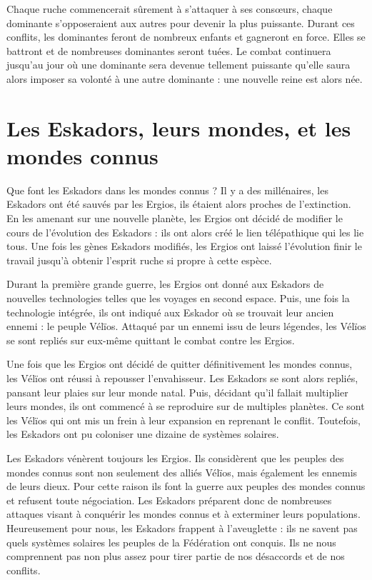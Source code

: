 \begin{multicols}{2}
Chaque ruche commencerait sûrement à s'attaquer à ses consœurs, chaque dominante s'opposeraient aux autres pour devenir la plus puissante. Durant ces conflits, les dominantes feront de nombreux enfants et gagneront en force. Elles se battront et de nombreuses dominantes seront tuées. Le combat continuera jusqu'au jour où une dominante sera devenue tellement puissante qu'elle saura alors imposer sa volonté à une autre dominante : une nouvelle reine est alors née.

\section{Les Eskadors, leurs mondes, et les mondes connus}

Que font les Eskadors dans les mondes connus ? Il y a des millénaires, les Eskadors ont été sauvés par les Ergios, ils étaient alors proches de l'extinction. En les amenant sur une nouvelle planète, les Ergios ont décidé de modifier le cours de l'évolution des Eskadors : ils ont alors créé le lien télépathique qui les lie tous. Une fois les gènes Eskadors modifiés, les Ergios ont laissé l'évolution finir le travail jusqu'à obtenir l'esprit ruche si propre à cette espèce. 

Durant la première grande guerre, les Ergios ont donné aux Eskadors de nouvelles technologies telles que les voyages en second espace. Puis, une fois la technologie intégrée, ils ont indiqué aux Eskador où se trouvait leur ancien ennemi : le peuple Vélïos. Attaqué par un ennemi issu de leurs légendes, les Vélïos se sont repliés sur eux-même quittant le combat contre les Ergios.

Une fois que les Ergios ont décidé de quitter définitivement les mondes connus, les Vélïos ont réussi à repousser l'envahisseur. Les Eskadors se sont alors repliés, pansant leur plaies sur leur monde natal. Puis, décidant qu'il fallait multiplier leurs mondes, ils ont commencé à se reproduire sur de multiples planètes. Ce sont les Vélïos qui ont mis un frein à leur expansion en reprenant le conflit. Toutefois, les Eskadors ont pu coloniser une dizaine de systèmes solaires.

Les Eskadors vénèrent toujours les Ergios. Ils considèrent que les peuples des mondes connus sont non seulement des alliés Vélïos, mais également les ennemis de leurs dieux. Pour cette raison ils font la guerre aux peuples des mondes connus et refusent toute négociation. Les Eskadors préparent donc de nombreuses attaques visant à conquérir les mondes connus et à exterminer leurs populations. Heureusement pour nous, les Eskadors frappent à l'aveuglette : ils ne savent pas quels systèmes solaires les peuples de la Fédération ont conquis. Ils ne nous comprennent pas non plus assez pour tirer partie de nos désaccords et de nos conflits.

\end{multicols}

